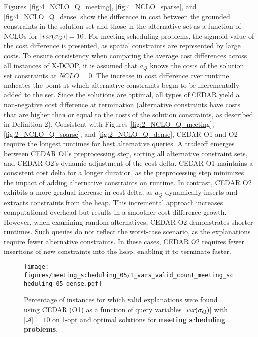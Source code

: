 \documentclass[twoside,11pt]{article}
\begin{document}
Figures~\ref{fig:4_NCLO_Q_meeting}, \ref{fig:4_NCLO_sparse}, and \ref{fig:4_NCLO_Q_dense} show the difference in cost between the grounded constraints in the solution set and those in the alternative set as a function of NCLOs for $|{\textit{var}(\sigma_Q)}| = 10$. For meeting scheduling problems, the sigmoid value of the cost difference is presented, as spatial constraints are represented by large costs. To ensure consistency when comparing the average cost differences across all instances of X-DCOP, it is assumed that $a_Q$ knows the costs of the solution set constraints at $NCLO = 0$. The increase in cost difference over runtime indicates the point at which alternative constraints begin to be incrementally added to the set. Since the solutions are optimal, all types of CEDAR yield a non-negative cost difference at termination (alternative constraints have costs that are higher than or equal to the costs of the solution constraints, as described in Definition 2). Consistent with Figures~\ref{fig:2_NCLO_Q_meeting}, \ref{fig:2_NCLO_Q_sparse}, and \ref{fig:2_NCLO_Q_dense}, CEDAR O1 and O2 require the longest runtimes for best alternative queries. A tradeoff emerges between CEDAR O1's preprocessing step, sorting all alternative constraint sets, and CEDAR O2's dynamic adjustment of the cost delta. CEDAR O1 maintains a consistent cost delta for a longer duration, as the preprocessing step minimizes the impact of adding alternative constraints on runtime. In contrast, CEDAR O2 exhibits a more gradual increase in cost delta, as $a_Q$ dynamically inserts and extracts constraints from the heap. This incremental approach increases computational overhead but results in a smoother cost difference growth. However, when examining random alternatives, CEDAR O2 demonstrates shorter runtimes. Such queries do not reflect the worst-case scenario, as the explanations require fewer alternative constraints. In these cases, CEDAR O2 requires fewer insertions of new constraints into the heap, enabling it to terminate faster.











\begin{figure}[h]
\centering
\small
\texttt{[image: figures/meeting\_scheduling\_05/1\_vars\_valid\_count\_meeting\_scheduling\_05\_dense.pdf]} \\ 
\vspace{-0.5em} 
\caption{Percentage of instances for which valid explanations were found using CEDAR (O1) as a function of query variables $|{\textit{var}(\sigma_Q)}|$  with $|\mathcal{A}| = 10$ on 1-opt and optimal solutions for \textbf{meeting scheduling problems}.}
\label{fig:1_results_percent_query_meeting}
\end{figure}
\end{document}
